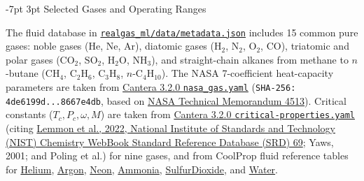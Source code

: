 \documentclass[10pt,a4paper]{article}
\makeatletter
\renewcommand\section{\@startsection {section}{1}{\z@}%
  {-7pt \@plus -2pt \@minus -1pt}%
  {3pt \@plus 1pt}%
  {\normalfont\large\bfseries\color{darkslate}}}
\makeatother
\begin{document}
\section{Selected Gases and Operating Ranges}

The fluid database in \href{https://github.com/satwikgupta122/realgas_ml/blob/main/realgas_ml/data/metadata.json}{\texttt{realgas\_ml/data/metadata.json}} includes 15 common pure gases: noble gases ($\mathrm{He}$, $\mathrm{Ne}$, $\mathrm{Ar}$), diatomic gases ($\mathrm{H_2}$, $\mathrm{N_2}$, $\mathrm{O_2}$, $\mathrm{CO}$), triatomic and polar gases ($\mathrm{CO_2}$, $\mathrm{SO_2}$, $\mathrm{H_2O}$, $\mathrm{NH_3}$), and straight-chain alkanes from methane to $n$-butane ($\mathrm{CH_4}$, $\mathrm{C_2H_6}$, $\mathrm{C_3H_8}$, $n\text{-}\mathrm{C_4H_{10}}$). The NASA 7-coefficient heat-capacity parameters are taken from \href{https://github.com/Cantera/cantera/blob/v3.2.0/data/nasa_gas.yaml}{Cantera 3.2.0 \texttt{nasa\_gas.yaml}} (\texttt{SHA-256: 4de6199d...8667e4db}, based on \href{https://ntrs.nasa.gov/citations/19940013151}{NASA Technical Memorandum 4513}). Critical constants ($T_c, P_c, \omega, M$) are taken from \href{https://github.com/Cantera/cantera/blob/v3.2.0/data/critical-properties.yaml}{Cantera 3.2.0 \texttt{critical-properties.yaml}} (citing \href{https://doi.org/10.18434/T4D303}{Lemmon et al., 2022, National Institute of Standards and Technology (NIST) Chemistry WebBook Standard Reference Database (SRD) 69}; Yaws, 2001; and Poling et al.) for nine gases, and from CoolProp fluid reference tables for \href{https://coolprop.org/fluid_properties/fluids/Helium.html}{Helium}, \href{https://coolprop.org/fluid_properties/fluids/Argon.html}{Argon}, \href{https://coolprop.org/fluid_properties/fluids/Neon.html}{Neon}, \href{https://coolprop.org/fluid_properties/fluids/Ammonia.html}{Ammonia}, \href{https://coolprop.org/fluid_properties/fluids/SulfurDioxide.html}{SulfurDioxide}, and \href{https://coolprop.org/fluid_properties/fluids/Water.html}{Water}.
\end{document}
